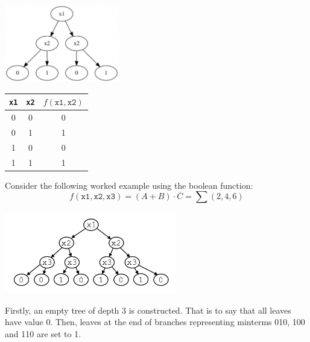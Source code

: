 \documentclass[12pt]{article}
\begin{document}
    \begin{minipage}{\linewidth}
        \begin{multicols}{2}
            \begin{center} \null \vfill
                \includegraphics[width=5cm, interpolate]{rsc/bt2.png}
                \parbox{\linewidth}{}

                \columnbreak
                \null \vfill

                \begin{tabular}[t]{ c|c|c }
                    \texttt{x1} & \texttt{x2}   & $f(\texttt{x1},\texttt{x2})$ \\ \hline
                    0           & 0             & 0 \\
                    0           & 1             & 1 \\ \hline\hline
                    1           & 0             & 0 \\
                    1           & 1             & 1
                \end{tabular}  \null \vspace{2ex}
                \parbox{\linewidth}{}
            \end{center}
        \end{multicols}
    \end{minipage}

    \pagebreak

    Consider the following worked example using the boolean function: \[f(\texttt{x1},\texttt{x2},\texttt{x3})=(A+B)\cdot\overline{C}=\sum\left(2,4,6\right)\] \vspace{-6ex}
    \begin{center}
        \includegraphics[width=7.5cm, interpolate]{rsc/bt3.png}
        \parbox{\linewidth}{}
    \end{center} \vspace{-3ex}
    Firstly, an empty tree of depth 3 is constructed. That is to say that all leaves have value 0. Then, leaves at the end of branches representing minterms 010, 100 and 110 are set to 1.
\end{document}
